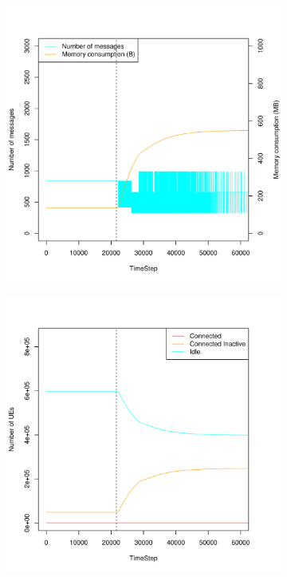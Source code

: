 \documentclass[a4j]{ujarticle}
\begin{document}
\begin{figure}[htbp]
\begin{subfigure}{0.49\hsize}
   \label{subfig:scenario_5_idleTimer_86400_345600_1_0_0_0_ideal}
 \end{subfigure}
 \par\bigskip %
 \begin{subfigure}{0.49\hsize}
   \centering
   \includegraphics[width=1.0\hsize]{scenario_5_signaling_and_memoryload_vs_timeStep_86400_345600_1_0_0_0_ideal.pdf}
   \label{subfig:scenario_5_signaling_and_memoryload_vs_timeStep_86400_345600_1_0_0_0_ideal}
 \end{subfigure}
 \begin{subfigure}{0.49\hsize}
   \centering
   \includegraphics[width=1.0\hsize]{scenario_5_stateBreakdown_86400_345600_1_0_0_0_ideal.pdf}

\end{subfigure}
\end{figure}
\end{document}
